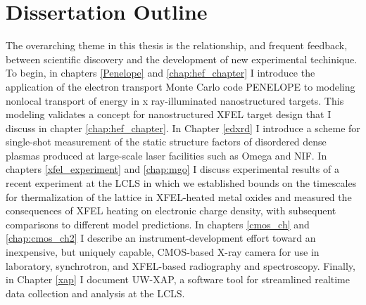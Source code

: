 \documentclass [11pt, proquest, article] {uwthesis}[2016/11/22]
\begin{document}
%





\section{Dissertation Outline}
The overarching theme in this thesis is the relationship, and frequent feedback, between scientific discovery and the development of new experimental techinique.  
To begin, in chapters \ref{Penelope} and \ref{chap:hef_chapter} I introduce the application of the electron transport Monte Carlo code PENELOPE to modeling nonlocal transport of energy in x ray-illuminated nanostructured targets. This modeling validates a concept for nanostructured XFEL target design that I discuss in chapter \ref{chap:hef_chapter}.
In Chapter \ref{edxrd} I introduce a scheme for single-shot measurement of the static structure factors of disordered dense plasmas produced at large-scale laser facilities such as Omega and NIF.
In chapters \ref{xfel_experiment} and \ref{chap:mgo} I discuss experimental results of a recent experiment at the LCLS in which we established bounds on the timescales for thermalization of the lattice in XFEL-heated metal oxides and measured the consequences of XFEL heating on electronic charge density, with subsequent comparisons to different model predictions.  In chapters \ref{cmos_ch} and \ref{chap:cmos_ch2} I describe an instrument-development effort toward an inexpensive, but uniquely capable, CMOS-based X-ray camera for use in laboratory, synchrotron, and XFEL-based radiography and spectroscopy. Finally, in Chapter \ref{xap} I document UW-XAP, a software tool for streamlined realtime data collection and analysis at the LCLS. 
 
\end{document}
